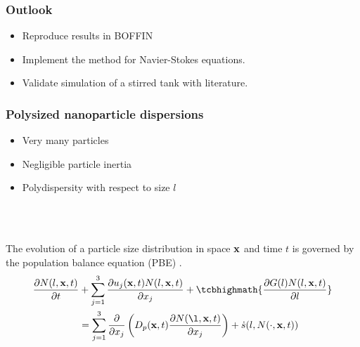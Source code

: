 \documentclass[10pt,xcolor=dvipsnames]{beamer}
\newcommand*{\itemskip}{0.25\baselineskip}
\renewcommand{\cite}{\parencite}
\begin{document}
\begin{frame}
\frametitle{Outlook}
\begin{itemize}
   \item Reproduce results in BOFFIN
   \item Implement the method for Navier-Stokes equations.
   \item Validate simulation of a stirred tank with literature.
 \end{itemize}

\end{frame}









\begin{frame}[t]

  \frametitle{Polysized nanoparticle dispersions}

  \vspace{-0.5\baselineskip}
  \begin{minipage}[t]{0.6\columnwidth}\vskip0pt
  \justifying{}
  \begin{itemize}
  \item Very many particles
  \vspace{\itemskip}
  \item Negligible particle inertia
  \vspace{\itemskip}
  \item Polydispersity with respect to size $l$
  \end{itemize}
  \end{minipage}\hfill
  \begin{minipage}[t]{0.38\columnwidth}\vskip0pt
  \resizebox{\columnwidth}{!}{}
  \end{minipage}\\
  \vspace{0.5\baselineskip}

  \\
  \justifying The evolution of a particle size distribution in space ${\mathbf x}$ and time $t$ is governed by the population balance equation (PBE) \cite{Hulburt1964}.
  \begin{equation*}
  \begin{split}
    \frac{\partial N(l, \xbf, t)}{\partial t} &+ \sum_{j = 1}^{3} \frac{\partial u_j(\xbf, t) N(l, \xbf, t)}{\partial x_j}
    + \tcbhighmath{\frac{\partial G(l) N(l, \xbf, t)}{\partial l}} \\
    &= \sum_{j = 1}^{3} \frac{\partial}{\partial x_j}\left(D_p(\xbf, t) \frac{\partial N(\l, \xbf, t)}{\partial x_j}\right) + \dot{s}(l, N(\cdot, \xbf, t))
  \label{eq:pbe}
  \end{split}
  \end{equation*}


\end{frame}
\end{document}
